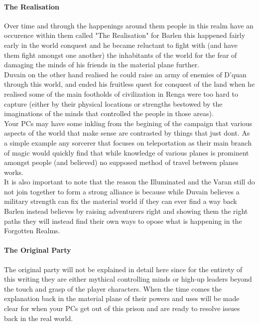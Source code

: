 \documentclass[10pt,twoside,twocolumn]{article}
\begin{document}
\paragraph{The Realisation}
Over time and through the happenings around them people in this realm have an occurence within them called "The Realisation" for Barlen this happened fairly early in the world conquest and he became reluctant to fight with (and have them fight amongst one another) the inhabitants of the world for the fear of damaging the minds of his friends in the material plane further.\\

Duvain on the other hand realised he could raise an army of enemies of D'quan through this world, and ended his fruitless quest for conquest of the land when he realised some of the main footholds of civilization in Renga were too hard to capture (either by their physical locations or strengths bestowed by the imaginations of the minds that controlled the people in those areas).\\

Your PCs may have some inkling from the begining of the campaign that various aspects of the world that make sense are contrasted by things that just dont. As a simple example any sorcerer that focuses on teleportation as their main branch of magic would quickly find that while knowledge of various planes is prominent amongst people (and believed) no supposed method of travel between planes works.\\

It is also important to note that the reason the Illuminated and the Varan still do not join together to form a strong alliance is because while Duvain believes a military strength can fix the material world if they can ever find a way back Barlen instead believes by raising adventurers right and showing them the right paths they will instead find their own ways to opose what is happening in the Forgotten Realms.\\

\paragraph{The Original Party}
The original party will not be explained in detail here since for the entirety of this writing they are either mythical controlling minds or high-up leaders beyond the touch and grasp of the player characters. When the time comes the explanation back in the material plane of their powers and uses will be made clear for when your PCs get out of this prison and are ready to resolve issues back in the real world.\\
\end{document}
